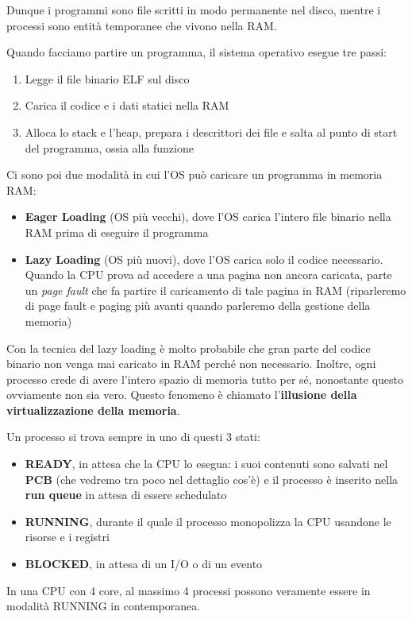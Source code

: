 \documentclass[11pt, a4paper, titlepage, oneside]{scrbook}
\begin{document}
Dunque i programmi sono file scritti in modo permanente nel disco, mentre i processi sono entità temporanee che vivono nella RAM. 

Quando facciamo partire un programma, il sistema operativo esegue tre passi:
\begin{enumerate}[label=\arabic*°]
    \item Legge il file binario ELF sul disco
    \item Carica il codice e i dati statici nella RAM
    \item Alloca lo stack e l'heap, prepara i descrittori dei file e salta al punto di start del programma, ossia alla funzione 
\end{enumerate}

\begin{Proprieta}
\label{prop-caricare-file-RAM}
Ci sono poi due modalità in cui l'OS può caricare un programma in memoria RAM:
\begin{itemize}
    \item \textbf{Eager Loading} (OS più vecchi), dove l'OS carica l'intero file binario nella RAM prima di eseguire il programma
    \item \textbf{Lazy Loading} (OS più nuovi), dove l'OS carica solo il codice necessario. Quando la CPU prova ad accedere a una pagina non ancora caricata, parte un \textit{page fault} che fa partire il caricamento di tale pagina in RAM (riparleremo di page fault e paging più avanti quando parleremo della gestione della memoria)
\end{itemize}
\end{Proprieta}

Con la tecnica del lazy loading è molto probabile che gran parte del codice binario non venga mai caricato in RAM perché non necessario. Inoltre, ogni processo crede di avere l'intero spazio di memoria tutto per sé, nonostante questo ovviamente non sia vero. Questo fenomeno è chiamato l'\textbf{illusione della virtualizzazione della memoria}. 

\begin{Proprieta}
\label{prop-stati-processo}
Un processo si trova sempre in uno di questi 3 stati:
\begin{itemize}
    \item \textbf{READY}, in attesa che la CPU lo esegua: i suoi contenuti sono salvati nel \textbf{PCB} (che vedremo tra poco nel dettaglio cos'è) e il processo è inserito nella \textbf{run queue} in attesa di essere schedulato
    \item \textbf{RUNNING}, durante il quale il processo monopolizza la CPU usandone le risorse e i registri
    \item \textbf{BLOCKED}, in attesa di un I/O o di un evento
\end{itemize}
\NB In una CPU con 4 core, al massimo 4 processi possono veramente essere in modalità RUNNING in contemporanea.
\end{Proprieta}
\end{document}
